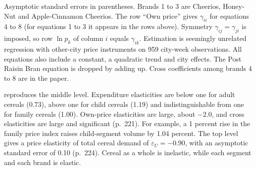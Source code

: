 \begin{table}[htbp]
\begin{threeparttable}
\begin{tablenotes}[flushleft]
Asymptotic standard errors in parentheses. Brands 1 to 3 are Cheerios, Honey-Nut and Apple-Cinnamon
Cheerios. The row ``Own price'' gives $\gamma_{ii}$ for equations 4 to 8 (for equations 1 to 3 it appears in
the rows above). Symmetry $\gamma_{ij} = \gamma_{ji}$ is imposed, so row $\ln p_k$ of column $i$ equals
$\gamma_{ik}$. Estimation is seemingly unrelated regression with other-city price instruments on 959
city-week observations. All equations also include a constant, a quadratic trend and city effects. The
Post Raisin Bran equation is dropped by adding up. Cross coefficients among brands 4 to 8 are in the paper.
\end{tablenotes}
\end{threeparttable}
\end{table}

 reproduces the middle level. Expenditure elasticities are below one for adult
cereals (0.73), above one for child cereals (1.19) and indistinguishable from one for family cereals (1.00).
Own-price elasticities are large, about $-2.0$, and cross elasticities are large and significant (p.~221).
For example, a 1 percent rise in the family price index raises child-segment volume by 1.04 percent. The top
level gives a price elasticity of total cereal demand of $\varepsilon_U = -0.90$, with an asymptotic standard
error of 0.10 (p.~224). Cereal as a whole is inelastic, while each segment and each brand is elastic.

